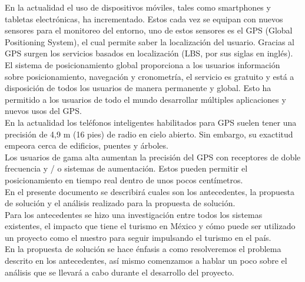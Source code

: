 \vspace*{7cm}
\rightline{{\Huge \textcolor{sectionColor}{Introducción}}}
\vspace*{2cm}


En la actualidad el uso de dispositivos móviles, tales como smartphones y tabletas electrónicas, ha incrementado. Estos cada vez se equipan con nuevos sensores para el monitoreo del entorno, uno de estos sensores es el GPS (Global Positioning System), el cual permite saber la localización del usuario. Gracias al GPS surgen los servicios basados en localización (LBS, por sus siglas en inglés).\\

El sistema de posicionamiento global proporciona a los usuarios información sobre posicionamiento, navegación y cronometría, el servicio es gratuito y está a disposición de todos los usuarios de manera permanente y global. Esto  ha permitido a los usuarios de todo el mundo desarrollar múltiples aplicaciones y nuevos usos del GPS.\\

En la actualidad los teléfonos inteligentes habilitados para GPS suelen tener una precisión de 4,9 m (16 pies) de radio en cielo abierto. Sin embargo, su exactitud empeora cerca de edificios, puentes y árboles.\\

Los usuarios de gama alta aumentan la precisión del GPS con receptores de doble frecuencia y / o sistemas de aumentación. Estos pueden permitir el posicionamiento en tiempo real dentro de unos pocos centímetros.\cite{gps} \\

En el presente documento se describirá cuales son los antecedentes, la propuesta de solución y el análisis realizado para la propuesta de solución.\\

Para los antecedentes se hizo una investigación entre todos los sistemas existentes, el impacto que tiene el turismo en México y cómo puede ser utilizado un proyecto como el nuestro para seguir impulsando el turismo en el país. \\

En la propuesta de solución se hace énfasis a como resolveremos el problema descrito en los antecedentes, así mismo comenzamos a hablar un poco sobre el análisis que se llevará a cabo durante el desarrollo del proyecto. \\

